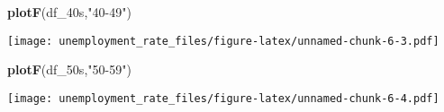\documentclass[]{article}
\newenvironment{Shaded}{\begin{snugshade}}{\end{snugshade}}
\newcommand{\KeywordTok}[1]{\textcolor[rgb]{0.13,0.29,0.53}{\textbf{#1}}}
\newcommand{\NormalTok}[1]{#1}
\newcommand{\StringTok}[1]{\textcolor[rgb]{0.31,0.60,0.02}{#1}}
\begin{document}
\begin{Shaded}
\begin{Highlighting}[]
\KeywordTok{plotF}\NormalTok{(df_40s,}\StringTok{"40-49"}\NormalTok{)}
\end{Highlighting}
\end{Shaded}

\texttt{[image: unemployment\_rate\_files/figure-latex/unnamed-chunk-6-3.pdf]}

\begin{Shaded}
\begin{Highlighting}[]
\KeywordTok{plotF}\NormalTok{(df_50s,}\StringTok{"50-59"}\NormalTok{)}
\end{Highlighting}
\end{Shaded}

\texttt{[image: unemployment\_rate\_files/figure-latex/unnamed-chunk-6-4.pdf]}
\end{document}
